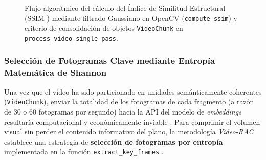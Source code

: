 \begin{figure}[htbp]
\caption{Flujo algorítmico del cálculo del Índice de Similitud Estructural (SSIM \cite{wang2004ssim}) mediante filtrado Gaussiano en OpenCV (\texttt{compute\_ssim}) y criterio de consolidación de objetos \texttt{VideoChunk} en \texttt{process\_video\_single\_pass}.} %
\label{fig:pipeline_ssim_opencv}
\end{figure}

\subsubsection{Selección de Fotogramas Clave mediante Entropía Matemática de Shannon}
\label{subsubsec:seleccion_entropia_shannon}

Una vez que el vídeo ha sido particionado en unidades semánticamente coherentes (\texttt{VideoChunk}), enviar la totalidad de los fotogramas de cada fragmento (a razón de $30$ o $60$ fotogramas por segundo) hacia la API del modelo de \textit{embeddings} resultaría computacional y económicamente inviable \cite{video_rac2025, gemini_emb2_docs}. %
Para comprimir el volumen visual sin perder el contenido informativo del plano, la metodología \textit{Video-RAC} establece una estrategia de \textbf{selección de fotogramas por entropía} implementada en la función \texttt{extract\_key\_frames} \cite{video_rac2025}. %

